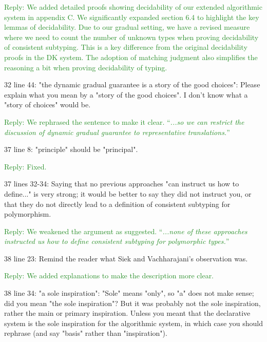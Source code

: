 \documentclass[dvipsnames]{article}
\newcommand\mynote[3]{\textcolor{#2}{#1: #3}}
\newcommand\bruno[1]{\mynote{Bruno}{red}{#1}}
\newcommand\reply[1]{\textcolor{ForestGreen}{Reply: #1}}
\begin{document}
\reply{We added detailed proofs showing decidability of our extended algorithmic
  system in appendix C. We significantly expanded section 6.4 to highlight the
  key lemmas of decidability. Due to our gradual setting, we have a revised
  measure where we need to count the number of unknown types when proving
  decidability of consistent subtyping. This is a key difference from the
  original decidability proofs in the DK system. The adoption of matching
  judgment also simplifies the reasoning a bit when proving decidability of typing.
}




32 line 44: "the dynamic gradual guarantee is a story of the good choices":
Please explain what you mean by a "story of the good choices". I don't know what
a "story of choices" would be.

\reply{We rephrased the sentence to make it clear. ``\emph{...so we can
    restrict the discussion of dynamic gradual guarantee to representative translations.}''}

37 line 8: "principle" should be "principal".

\reply{Fixed.}

37 lines 32-34: Saying that no previous approaches "can instruct us how to
define..." is very strong; it would be better to say they did not instruct you,
or that they do not directly lead to a definition of consistent subtyping for
polymorphism.

\reply{We weakened the argument as suggested. ``\emph{...none of these
    approaches instructed us how to define consistent subtyping for polymorphic
    types.}''}

38 line 23: Remind the reader what Siek and Vachharajani's observation was.

\reply{We added explanations to make the description more clear.}

38 line 34: "a sole inspiration": "Sole" means "only", so "a" does not make
sense; did you mean "the sole inspiration"? But it was probably not the sole
inspiration, rather the main or primary inspiration. Unless you meant that the
declarative system is the sole inspiration for the algorithmic system, in which
case you should rephrase (and say "basis" rather than "inspiration").
\end{document}
